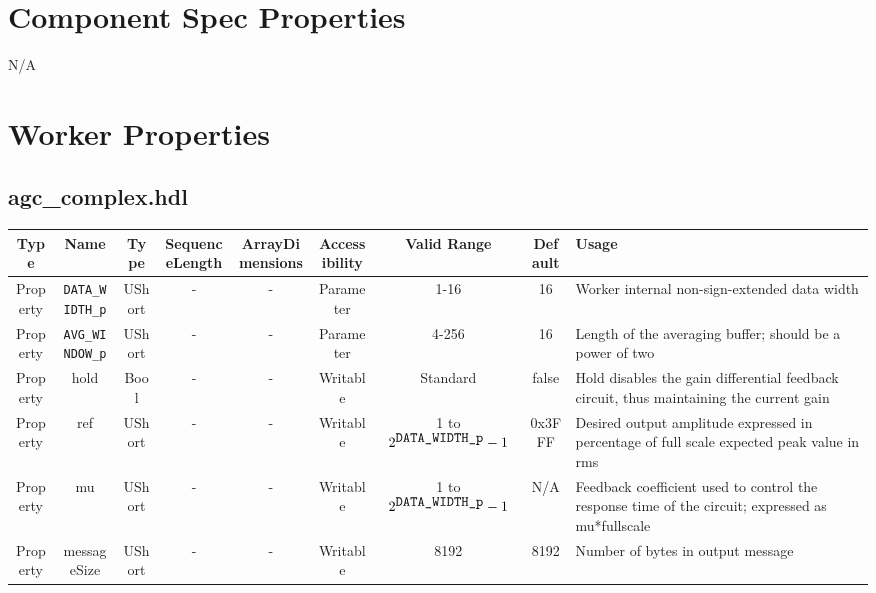 \documentclass{article}
\def\comp{agc\_complex}
\begin{document}
\begin{landscape}
	\section*{Component Spec Properties}
		N/A

	\section*{Worker Properties}
	\subsection*{\comp.hdl}
	\begin{scriptsize}
		\begin{tabular}{|c|c|c|c|c|c|c|c|p{6.9cm}|}
			\hline
			\rowcolor{blue}
			Type     & Name                & Type   & SequenceLength & ArrayDimensions & Accessibility       & Valid Range & Default & Usage                                        \\
			\hline
			Property & \verb+DATA_WIDTH_p+ & UShort & -              & -               & Parameter & 1-16        & 16      & Worker internal non-sign-extended data width \\
			\hline
			Property & \verb+AVG_WINDOW_p+ & UShort & -              & -               & Parameter & 4-256       & 16      & Length of the averaging buffer; should be a power of two \\
			\hline
			Property & hold                & Bool   & -              & -               & Writable  & Standard    & false   & Hold disables the gain differential feedback circuit, thus maintaining the current gain \\
			\hline
			Property & ref                 & UShort & -              & -               & Writable  & 1 to $2^{\verb+DATA_WIDTH_p+}-1$ & 0x3FFF & Desired output amplitude expressed in percentage of full scale expected peak value in rms \\
			\hline
			Property & mu                  & UShort & -              & -               & Writable  & 1 to $2^{\verb+DATA_WIDTH_p+}-1$ & N/A & Feedback coefficient used to control the response time of the circuit; expressed as mu*fullscale \\
			\hline
			Property & messageSize         & UShort & -              & -               & Writable  & 8192        & 8192    & Number of bytes in output message                            \\
			\hline
		\end{tabular}
	\end{scriptsize}


\end{landscape}
\end{document}
